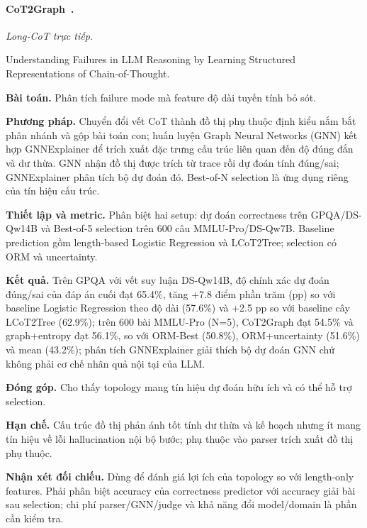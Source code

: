 \begin{samepage}
\paragraph{CoT2Graph~\cite{rra3_cot2graph}.}
\emph{Long-CoT trực tiếp.}\par
{\raggedright\noindent\small Understanding Failures in LLM Reasoning by Learning Structured Representations of Chain-of-Thought.\par}
\noindent\textbf{Bài toán.} Phân tích failure mode mà feature độ dài tuyến tính bỏ sót.\par
\end{samepage}
\noindent\textbf{Phương pháp.} Chuyển đổi vết CoT thành đồ thị phụ thuộc định kiểu nắm bắt phân nhánh và gộp bài toán con; huấn luyện Graph Neural Networks (GNN) kết hợp GNNExplainer để trích xuất đặc trưng cấu trúc liên quan đến độ đúng đắn và dư thừa. GNN nhận đồ thị được trích từ trace rồi dự đoán tính đúng/sai; GNNExplainer phân tích bộ dự đoán đó. Best-of-N selection là ứng dụng riêng của tín hiệu cấu trúc.\par
\noindent\textbf{Thiết lập và metric.} Phân biệt hai setup: dự đoán correctness trên GPQA/DS-Qw14B và Best-of-5 selection trên 600 câu MMLU-Pro/DS-Qw7B. Baseline prediction gồm length-based Logistic Regression và LCoT2Tree; selection có ORM và uncertainty.\par
\noindent\textbf{Kết quả.} Trên GPQA với vết suy luận DS-Qw14B, độ chính xác dự đoán đúng/sai của đáp án cuối đạt 65.4\%, tăng +7.8 điểm phần trăm (pp) so với baseline Logistic Regression theo độ dài (57.6\%) và +2.5 pp so với baseline cây LCoT2Tree (62.9\%); trên 600 bài MMLU-Pro (N=5), CoT2Graph đạt 54.5\% và graph+entropy đạt 56.1\%, so với ORM-Best (50.8\%), ORM+uncertainty (51.6\%) và mean (43.2\%); phân tích GNNExplainer giải thích bộ dự đoán GNN chứ không phải cơ chế nhân quả nội tại của LLM.\par
\noindent\textbf{Đóng góp.} Cho thấy topology mang tín hiệu dự đoán hữu ích và có thể hỗ trợ selection.\par
\noindent\textbf{Hạn chế.} Cấu trúc đồ thị phản ánh tốt tính dư thừa và kế hoạch nhưng ít mang tín hiệu về lỗi hallucination nội bộ bước; phụ thuộc vào parser trích xuất đồ thị phụ thuộc.\par
\begin{samepage}
\noindent\textbf{Nhận xét đối chiếu.} Dùng để đánh giá lợi ích của topology so với length-only features. Phải phân biệt accuracy của correctness predictor với accuracy giải bài sau selection; chi phí parser/GNN/judge và khả năng đổi model/domain là phần cần kiểm tra.\par
{}
\end{samepage}

